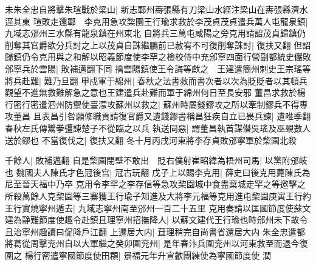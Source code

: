 未朱全忠自將擊朱瑄戰於梁山|{
	新志鄆州夀張縣有刀梁山水經注梁山在夀張縣濟水逕其東}
瑄敗走還鄆　李克用急攻棃園王行瑜求救於李茂貞茂貞遣兵萬人屯龍泉鎮|{
	九域志邠州三水縣有龍泉鎮在州東北}
自將兵三萬屯咸陽之旁克用請詔茂貞歸鎮仍削奪其官爵欲分兵討之上以茂貞自誅繼鵬前已赦宥不可復削奪誅討|{
	復扶又翻}
但詔歸鎮仍令克用與之和解以昭義節度使李罕之檢校侍中充邠寧四面行營副都統史儼敗邠寧兵於雲陽|{
	敗補邁翻下同}
擒雲陽鎮使王令誨等獻之　王建遣簡州刺史王宗瑤等將兵赴難|{
	難乃旦翻}
甲戍軍于綿州|{
	春秋之法書救而書次者以次為貶貶者以其頓兵觀望不進無救難解急之意也王建遣兵赴難而軍于綿州何日至長安邪}
董昌求救於楊行密行密遣泗州防禦使臺濛攻蘇州以救之|{
	蘇州時屬錢鏐攻之所以牽制鏐兵不得專攻董昌}
且表昌引咎願修職貢請復官爵又遺錢鏐書稱昌狂疾自立已畏兵諫|{
	遺唯季翻春秋左氏傳鬻拳彊諫楚子不從臨之以兵}
執送同惡|{
	謂董昌執首謀僭吳瑤及巫覡數人送於鏐也}
不當復伐之|{
	復扶又翻}
冬十月丙戌河東將李存貞敗邠寧軍於棃園北殺

千餘人|{
	敗補邁翻}
自是棃園閉壁不敢出　貶右僕射崔昭緯為梧州司馬|{
	以黨附邠岐也}
魏國夫人陳氏才色冠後宫|{
	冠古玩翻}
戊子上以賜李克用|{
	薛史曰後克用薨陳氏為尼至晉天福中乃卒}
克用令李罕之李存信等急攻棃園城中食盡棄城走罕之等邀擊之所殺萬餘人克棃園等三寨獲王行瑜子知進及大將李元福等克用進屯棃園庚寅王行約王行實燒寧州遁去|{
	九域志寧州南至邠州一百二十五里}
克用奏請以匡國節度使蘇文建為静難節度使趣令赴鎮且理寧州招撫降人|{
	以蘇文建代王行瑜也時邠州未下故令且治寧州趣讀曰促降戶江翻}
上遷居大内|{
	葺理稍完自尚書省還居大内}
朱全忠遣都將葛從周擊兖州自以大軍繼之癸卯圍兖州|{
	是年春汴兵圍兖州以河東救至而退今復圍之}
楊行密遣寧國節度使田頵|{
	景福元年升宣歙團練使為寧國節度使}
潤

